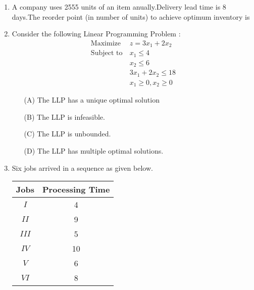 \documentclass[journal]{IEEEtran}
\begin{document}
\begin{enumerate}[start=37]
\begin{enumerate}
\end{enumerate}
\item A company uses 2555 units of an item anually.Delivery lead time is 8 days.The reorder point (in number of units) to achieve optimum inventory is 
\begin{enumerate}
\end{enumerate}
\item Consider the following Linear Programming Problem  :
	\begin{align}
		\text{Maximize} &\ z = 3x_1+2x_2 \\
		\text{Subject to} &\ x_1 \le 4 \\
		&\ x_2 \le 6 \\
		&\  3x_1+2x_2 \le 18 \\
		&\ x_1 \ge 0, x_2 \ge 0  
	\end{align}
\begin{enumerate}
\item [(A)] The LLP has a unique optimal solution 
\item [(B)] The LLP is infeasible.
\item [(C)] The LLP is unbounded.
\item [(D)] The LLP has multiple optimal solutions.
\end{enumerate}
\item Six jobs arrived in a sequence as given below.
	\begin{table}[h]
		\centering
		\begin{tabular}{|c|c|}
			\hline \textbf{Jobs} & \textbf{Processing Time \brak{days}} \\ \hline $I$ & 4 \\ \hline $II$ & 9 \\ \hline $III$ & 5 \\ \hline $IV$ & 10 \\ \hline $V$ & 6 \\ \hline $VI$ & 8 \\ \hline

\end{tabular}
\end{table}
\end{enumerate}
\end{document}
